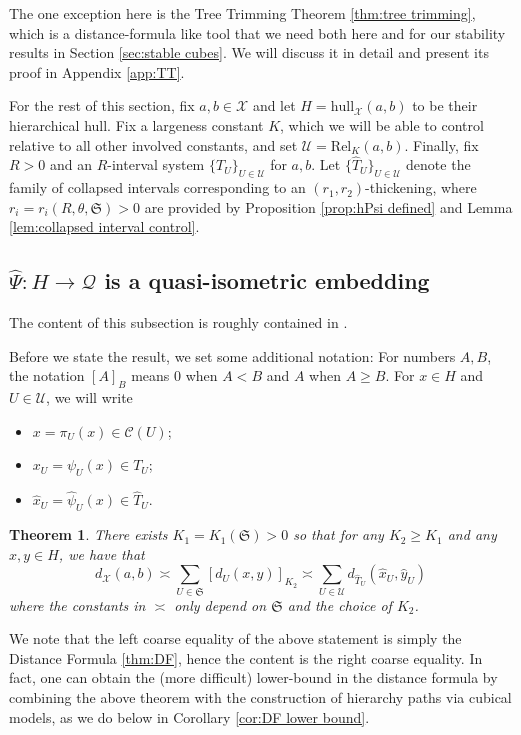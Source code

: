 \documentclass{amsart}
\newtheorem{theorem}{Theorem}[section]
\theoremstyle{definition}
\theoremstyle{remark}
\theoremstyle{definition}
\newcommand{\calC}{\mathcal{C}}
\newcommand{\calQ}{\mathcal{Q}}
\newcommand{\calU}{\mathcal{U}}
\newcommand{\calX}{\mathcal{X}}
\newcommand{\hT}{\widehat{T}}
\newcommand{\hx}{\hat{x}}
\newcommand{\hy}{\hat{y}}
\newcommand{\hpsi}{\hat{\psi}}
\newcommand{\hPsi}{\widehat{\Psi}}
\newcommand{\Rel}{\mathrm{Rel}}
\newcommand{\hull}{\mathrm{hull}}
\begin{document}
The one exception here is the Tree Trimming Theorem \ref{thm:tree trimming}, which is a distance-formula like tool that we need both here and for our stability results in Section \ref{sec:stable cubes}.  We will discuss it in detail and present its proof in Appendix \ref{app:TT}.

For the rest of this section, fix $a,b \in \calX$ and let $H = \hull_{\calX}(a,b)$ to be their hierarchical hull.  Fix a largeness constant $K$, which we will be able to control relative to all other involved constants, and set $\calU = \Rel_K(a,b)$.  Finally, fix $R>0$ and an $R$-interval system $\{T_U\}_{U \in \calU}$ for $a,b$.  Let $\{\hT_U\}_{U \in \calU}$ denote the family of collapsed intervals corresponding to an $(r_1,r_2)$-thickening, where $r_i = r_i(R,\theta,\mathfrak S)>0$ are provided by Proposition \ref{prop:hPsi defined} and Lemma \ref{lem:collapsed interval control}.

\subsection{$\hPsi:H \to \calQ$ is a quasi-isometric embedding}\label{subsec:Q qie}

The content of this subsection is roughly contained in \cite[Section 8]{Dur_infcube}.  

Before we state the result, we set some additional notation: For numbers $A,B$, the notation $[A]_B$ means $0$ when $A<B$ and $A$ when $A\geq B$.  For $x \in H$ and $U \in \calU$, we will write
\begin{itemize}
\item $x = \pi_U(x) \in \calC(U)$;
\item $x_U = \psi_U(x) \in T_U$;
\item $\hx_U = \hpsi_U(x) \in \hT_U$.
\end{itemize}

\begin{theorem}\label{thm:Q distance estimate}
There exists $K_1 = K_1(\mathfrak S)>0$ so that for any $K_2 \geq K_1$ and any $x, y \in H$, we have that
$$d_{\calX}(a,b) \asymp \sum_{U \in \mathfrak S} [d_U(x,y)]_{K_2} \asymp \sum_{U \in \calU} d_{\hT_U}(\hx_U,\hy_U)$$
where the constants in $\asymp$ only depend on $\mathfrak S$ and the choice of $K_2$.
\end{theorem}

We note that the left coarse equality of the above statement is simply the Distance Formula \ref{thm:DF}, hence the content is the right coarse equality.  In fact, one can obtain the (more difficult) lower-bound in the distance formula by combining the above theorem with the construction of hierarchy paths via cubical models, as we do below in Corollary \ref{cor:DF lower bound}.
\end{document}
